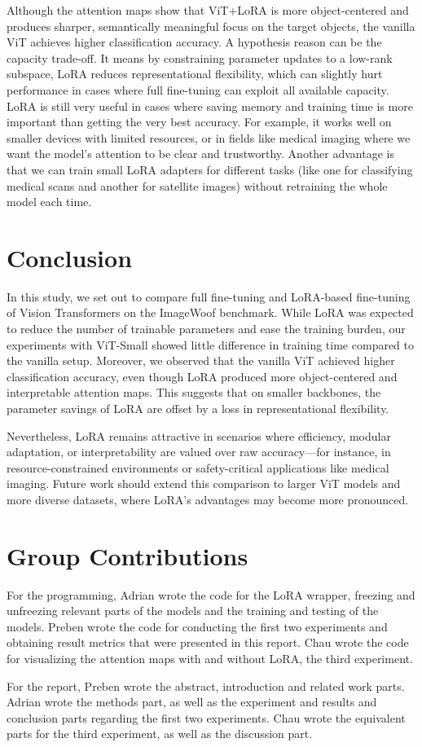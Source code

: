 \documentclass[10pt]{article}
\begin{document}
Although the attention maps show that ViT+LoRA is more object-centered and produces sharper, semantically meaningful focus on the target objects, the vanilla ViT achieves higher classification accuracy. A hypothesis reason can be the capacity trade-off. It means by constraining parameter updates to a low-rank subspace, LoRA reduces representational flexibility, which can slightly hurt performance in cases where full fine-tuning can exploit all available capacity. LoRA is still very useful in cases where saving memory and training time is more important than getting the very best accuracy. For example, it works well on smaller devices with limited resources, or in fields like medical imaging where we want the model’s attention to be clear and trustworthy. Another advantage is that we can train small LoRA adapters for different tasks (like one for classifying medical scans and another for satellite images) without retraining the whole model each time.

\section{Conclusion}
In this study, we set out to compare full fine-tuning and LoRA-based fine-tuning of Vision Transformers on the ImageWoof benchmark. While LoRA was expected to reduce the number of trainable parameters and ease the training burden, our experiments with ViT-Small showed little difference in training time compared to the vanilla setup. Moreover, we observed that the vanilla ViT achieved higher classification accuracy, even though LoRA produced more object-centered and interpretable attention maps. This suggests that on smaller backbones, the parameter savings of LoRA are offset by a loss in representational flexibility. 

Nevertheless, LoRA remains attractive in scenarios where efficiency, modular adaptation, or interpretability are valued over raw accuracy—for instance, in resource-constrained environments or safety-critical applications like medical imaging. Future work should extend this comparison to larger ViT models and more diverse datasets, where LoRA’s advantages may become more pronounced.

\section{Group Contributions}

For the programming, Adrian wrote the code for the LoRA wrapper, freezing and unfreezing relevant parts of the models and the training and testing of the models. Preben wrote the code for conducting the first two experiments and obtaining result metrics that were presented in this report. Chau wrote the code for visualizing the attention maps with and without LoRA, the third experiment.

For the report, Preben wrote the abstract, introduction and related work parts. Adrian wrote the methods part, as well as the experiment and results and conclusion parts regarding the first two experiments. Chau wrote the equivalent parts for the third experiment, as well as the discussion part.



\end{document}
